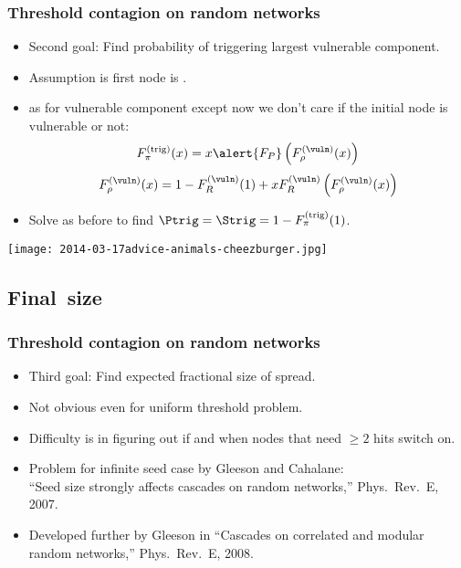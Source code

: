 \begin{frame}
  \frametitle{Threshold contagion on random networks}

  \begin{itemize}
  \item<1-> \alert{Second goal:}
    Find probability of triggering largest vulnerable 
    component.
  \item<2-> 
    Assumption is \alert{first node} is .
  \item<3->
     as for vulnerable component except
    now we don't care if the initial node is vulnerable or not:
    $$
    {F}_{\pi}^{(\textnormal{trig)}}(x)
    =
    x \alert{{F}_{P}}
    \left(
      {F}_{\rho}^{(\vuln)} (x)
    \right)
    $$
    $$
    {F}_{\rho}^{(\vuln)}(x)
    =
    1-{F}_R^{(\vuln)}(1)
    +
    x {{F}_{R}^{(\vuln)}}
    \left(
      {F}_{\rho}^{(\vuln)} (x)
    \right)
    $$
  \item<4->
    Solve as before to find $\Ptrig =  \Strig = 1 - F_\pi^{(\textnormal{trig)}}(1)$.
  \end{itemize}
\end{frame}

\begin{frame}[plain]
  \texttt{[image: 2014-03-17advice-animals-cheezburger.jpg]}
\end{frame}

\subsection{Final\ size}

\begin{frame}
  \frametitle{Threshold contagion on random networks}

  \begin{itemize}
  \item<1->
    \alert{Third goal:} Find expected fractional size of spread.
  \item<2->
    Not obvious even for uniform threshold problem.
  \item<3->
    Difficulty is in figuring out if and when
    nodes that need $\ge 2$ hits switch on.
  \item<4->
    Problem  for infinite seed case by Gleeson and Cahalane:\\
    ``Seed size strongly affects cascades on random networks,'' 
    Phys.\ Rev.\ E, 2007.\cite{gleeson2007a}
  \item<5->
    Developed further by Gleeson
    in ``Cascades on correlated and modular random networks,'' 
    Phys.\ Rev.\ E, 2008.\cite{gleeson2008a}
  \end{itemize}

\end{frame}

